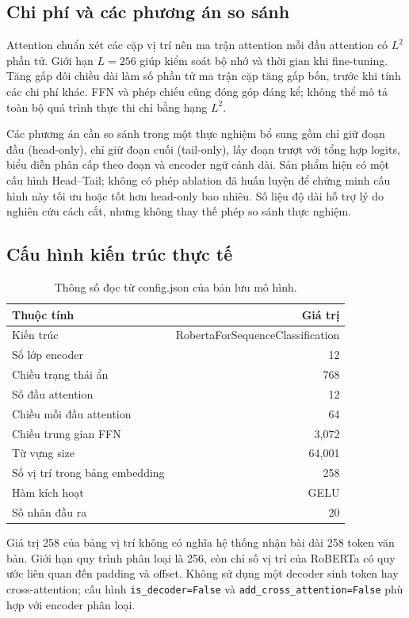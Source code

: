 \subsection{Chi phí và các phương án so sánh}
Attention chuẩn xét các cặp vị trí nên ma trận attention mỗi đầu attention có $L^2$ phần tử. Giới hạn $L=256$ giúp kiểm soát bộ nhớ và thời gian khi fine-tuning. Tăng gấp đôi chiều dài làm số phần tử ma trận cặp tăng gấp bốn, trước khi tính các chi phí khác. FFN và phép chiếu cũng đóng góp đáng kể; không thể mô tả toàn bộ quá trình thực thi chỉ bằng hạng $L^2$.

Các phương án cần so sánh trong một thực nghiệm bổ sung gồm chỉ giữ đoạn đầu (head-only), chỉ giữ đoạn cuối (tail-only), lấy đoạn trượt với tổng hợp logits, biểu diễn phân cấp theo đoạn và encoder ngữ cảnh dài. Sản phẩm hiện có một cấu hình Head--Tail; không có phép ablation đã huấn luyện để chứng minh cấu hình này tối ưu hoặc tốt hơn head-only bao nhiêu. Số liệu độ dài hỗ trợ lý do nghiên cứu cách cắt, nhưng không thay thế phép so sánh thực nghiệm.

\subsection{Cấu hình kiến trúc thực tế}
\begin{table}[htbp]\centering\caption{Thông số đọc từ config.json của bản lưu mô hình.}\small
\begin{tabular}{lr}\toprule
Thuộc tính & Giá trị\\\midrule
Kiến trúc & RobertaForSequenceClassification\\
Số lớp encoder & 12\\
Chiều trạng thái ẩn & 768\\
Số đầu attention & 12\\
Chiều mỗi đầu attention & 64\\
Chiều trung gian FFN & 3,072\\
Từ vựng size & 64,001\\
Số vị trí trong bảng embedding & 258\\
Hàm kích hoạt & GELU\\
Số nhãn đầu ra & 20\\\bottomrule
\end{tabular}\end{table}
Giá trị 258 của bảng vị trí không có nghĩa hệ thống nhận bài dài 258 token văn bản. Giới hạn quy trình phân loại là 256, còn chỉ số vị trí của RoBERTa có quy ước liên quan đến padding và offset. Không sử dụng một decoder sinh token hay cross-attention; cấu hình \texttt{is\_decoder=False} và \texttt{add\_cross\_attention=False} phù hợp với encoder phân loại.

